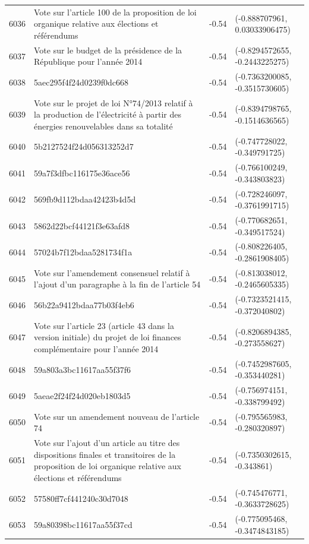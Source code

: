 \begin{table}[ht]
\begin{tabular}{rlrl}
  6036 & Vote sur l'article 100 de la proposition de loi organique relative aux élections et référendums & -0.54 & (-0.888707961, 0.03033906475) \\ 
  6037 & Vote sur le budget de la présidence de la République pour l'année 2014 & -0.54 & (-0.8294572655, -0.2443225275) \\ 
  6038 & 5aec295f4f24d0239f0dc668 & -0.54 & (-0.7363200085, -0.3515730605) \\ 
  6039 & Vote sur le projet de loi N°74/2013 relatif à la production de l'électricité à partir des énergies renouvelables dans sa totalité & -0.54 & (-0.8394798765, -0.1514636565) \\ 
  6040 & 5b2127524f24d056313252d7 & -0.54 & (-0.747728022, -0.349791725) \\ 
  6041 & 59a7f3dfbc116175e36ace56 & -0.54 & (-0.766100249, -0.343803823) \\ 
  6042 & 569fb9d112bdaa42423b4d5d & -0.54 & (-0.728246097, -0.3761991715) \\ 
  6043 & 5862d22bcf44121f3e63afd8 & -0.54 & (-0.770682651, -0.349517524) \\ 
  6044 & 57024b7f12bdaa5281734f1a & -0.54 & (-0.808226405, -0.2861908405) \\ 
  6045 & Vote sur l'amendement consensuel relatif à l'ajout d'un paragraphe à la fin de l'article 54 & -0.54 & (-0.813038012, -0.2465605335) \\ 
  6046 & 56b22a9412bdaa77b03f4eb6 & -0.54 & (-0.7323521415, -0.372040802) \\ 
  6047 & Vote sur l'article 23 (article 43 dans la version initiale) du projet de loi finances complémentaire pour l'année 2014 & -0.54 & (-0.8206894385, -0.273558627) \\ 
  6048 & 59a803a3bc11617aa55f37f6 & -0.54 & (-0.7452987605, -0.353440281) \\ 
  6049 & 5aeae2f24f24d020eb1803d5 & -0.54 & (-0.756974151, -0.338799492) \\ 
  6050 & Vote sur un amendement nouveau de l'article 74 & -0.54 & (-0.795565983, -0.280320897) \\ 
  6051 & Vote sur l'ajout d'un article au titre des dispositions finales et transitoires de la proposition de loi organique relative aux élections et référendums & -0.54 & (-0.7350302615, -0.343861) \\ 
  6052 & 57580ff7cf441240c30d7048 & -0.54 & (-0.745476771, -0.3633728625) \\ 
  6053 & 59a80398bc11617aa55f37cd & -0.54 & (-0.775095468, -0.3474843185) \\ 

\end{tabular}
\end{table}
